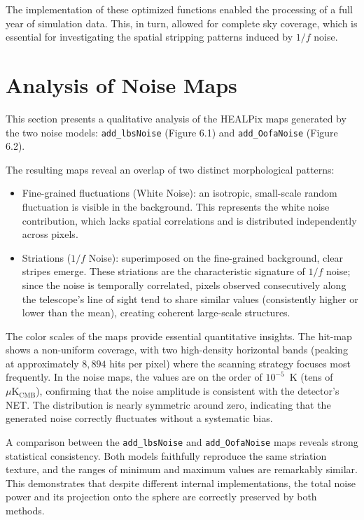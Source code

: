The implementation of these optimized functions enabled the processing of a full year of simulation data. This, in turn, allowed for complete sky coverage, which is essential for investigating the spatial stripping patterns induced by $1/f$ noise.




\section{Analysis of Noise Maps}

This section presents a qualitative analysis of the HEALPix maps generated by the two noise models: \texttt{add\_lbsNoise} (Figure 6.1) and \texttt{add\_OofaNoise} (Figure 6.2). 

The resulting maps reveal an overlap of two distinct morphological patterns:
\begin{itemize}
    \item Fine-grained fluctuations (White Noise): an isotropic, small-scale random fluctuation is visible in the background. This represents the white noise contribution, which lacks spatial correlations and is distributed independently across pixels.
    \item Striations ($1/f$ Noise): superimposed on the fine-grained background, clear stripes emerge. These striations are the characteristic signature of $1/f$ noise; since the noise is temporally correlated, pixels observed consecutively along the telescope's line of sight tend to share similar values (consistently higher or lower than the mean), creating coherent large-scale structures.
\end{itemize}

The color scales of the maps provide essential quantitative insights. The hit-map shows a non-uniform coverage, with two high-density horizontal bands (peaking at approximately $8,894$ hits per pixel) where the scanning strategy focuses most frequently. In the noise maps, the values are on the order of $10^{-5}$~K (tens of $\mu\text{K}_{\text{CMB}}$), confirming that the noise amplitude is consistent with the detector's NET. The distribution is nearly symmetric around zero, indicating that the generated noise correctly fluctuates without a systematic bias.

A comparison between the \texttt{add\_lbsNoise} and \texttt{add\_OofaNoise} maps reveals strong statistical consistency. Both models faithfully reproduce the same striation texture, and the ranges of minimum and maximum values are remarkably similar. This demonstrates that despite different internal implementations, the total noise power and its projection onto the sphere are correctly preserved by both methods. 

